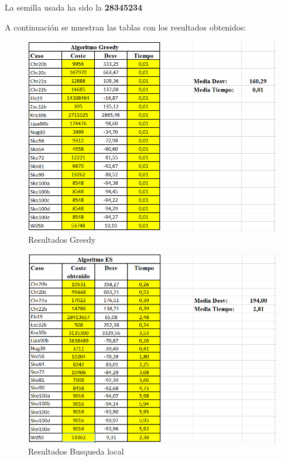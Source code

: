 La semilla usada ha sido la \textbf{28345234} 

A continuación se muestran las tablas con los resultados obtenidos:

	\begin{figure}[H]
		\centering
		\includegraphics[scale=1.0]{Screenshot_4.png}
		\caption{Resultados Greedy}
		\label{}
	\end{figure}

	\begin{figure}[H]
		\centering
		\includegraphics[scale=1.0]{Screenshot_5.png}
		\caption{Resultados Busqueda local}
		\label{}
	\end{figure}

